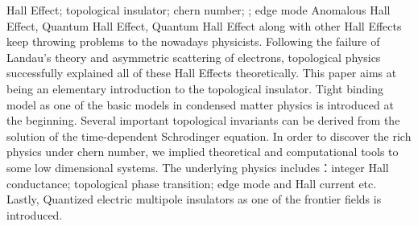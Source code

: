\makecover

\begin{abstract}{霍尔效应; 拓扑绝缘体; chern number; edge mode}
反常霍尔效应，量子霍尔效应和量子反常霍尔效应等一系列霍尔效应不断地给当代物理学家抛出一个个难题。在简单的朗道能级理论，电子在晶格中特异性散射理论失败的情况下，拓扑物理理论的出现并一举解决了这些问题。本文将会通过对低维模型的分析，对这个新的凝聚态分支做一个介绍。紧束缚模型作为凝聚态的基础被放到前面部分。之后文章会在求解含时薛定谔方程的过程中引入一些拓扑不变量的概念。我们还用了理论推演和数值计算的方法来揭示其中一个拓扑量—chern number 背后丰富的物理，包括：整数的霍尔电导；拓扑相变；edge mode和霍尔电流等。最后还对拓扑绝缘体的一个前沿方向—高阶拓扑绝缘体做出简要介绍。
\end{abstract}


\begin{abstractEng}{Hall Effect; topological insulator; chern number; ; edge mode}
Anomalous Hall Effect,  Quantum Hall Effect,  Quantum Hall Effect along with other Hall Effects keep throwing problems to the nowadays physicists. Following the failure of Landau's theory and asymmetric scattering of electrons, topological physics successfully explained all of these Hall Effects theoretically. This paper aims at being an elementary introduction to the topological insulator. Tight binding model as one of the basic models in condensed matter physics is introduced at the beginning. Several important topological invariants can be derived from the solution of the time-dependent Schrodinger equation. In order to discover the rich physics under chern number, we implied theoretical and computational tools to some low dimensional systems. The underlying physics includes：integer Hall conductance; topological phase transition; edge mode and Hall current etc. Lastly, Quantized electric multipole insulators as one of the frontier fields is introduced.
\end{abstractEng}


\tableofcontents